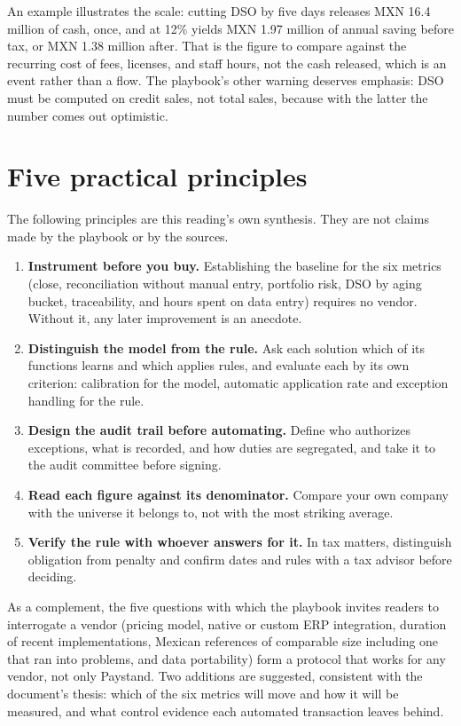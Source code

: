 \documentclass[11pt,a4paper]{article}
\begin{document}
An example illustrates the scale: cutting DSO by five days releases MXN 16.4 million of cash, once, and at 12\% yields MXN 1.97 million of annual saving before tax, or MXN 1.38 million after. That is the figure to compare against the recurring cost of fees, licenses, and staff hours, not the cash released, which is an event rather than a flow. The playbook's other warning deserves emphasis: DSO must be computed on credit sales, not total sales, because with the latter the number comes out optimistic.

\section{Five practical principles}

The following principles are this reading's own synthesis. They are not claims made by the playbook or by the sources.

\begin{enumerate}[leftmargin=1.6em, itemsep=0.2em]
\item \textbf{Instrument before you buy.} Establishing the baseline for the six metrics (close, reconciliation without manual entry, portfolio risk, DSO by aging bucket, traceability, and hours spent on data entry) requires no vendor. Without it, any later improvement is an anecdote.
\item \textbf{Distinguish the model from the rule.} Ask each solution which of its functions learns and which applies rules, and evaluate each by its own criterion: calibration for the model, automatic application rate and exception handling for the rule.
\item \textbf{Design the audit trail before automating.} Define who authorizes exceptions, what is recorded, and how duties are segregated, and take it to the audit committee before signing.
\item \textbf{Read each figure against its denominator.} Compare your own company with the universe it belongs to, not with the most striking average.
\item \textbf{Verify the rule with whoever answers for it.} In tax matters, distinguish obligation from penalty and confirm dates and rules with a tax advisor before deciding.
\end{enumerate}

As a complement, the five questions with which the playbook invites readers to interrogate a vendor (pricing model, native or custom ERP integration, duration of recent implementations, Mexican references of comparable size including one that ran into problems, and data portability) form a protocol that works for any vendor, not only Paystand. Two additions are suggested, consistent with the document's thesis: which of the six metrics will move and how it will be measured, and what control evidence each automated transaction leaves behind.
\end{document}
